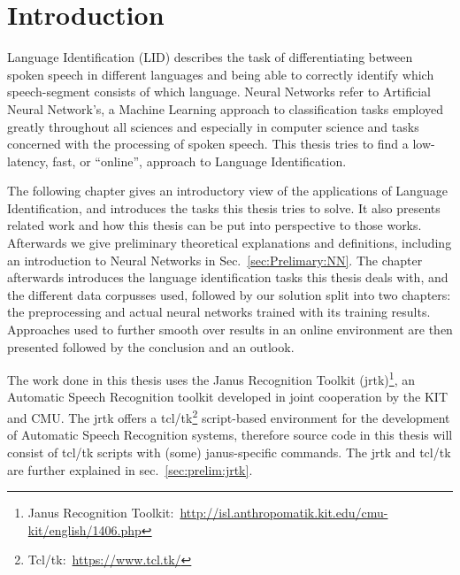 
\chapter{Introduction}
\label{ch:Introduction}
Language Identification (LID) describes the task of differentiating between spoken speech in different languages and being able to correctly identify which speech-segment consists of which language.  Neural Networks refer to Artificial Neural Network's, a Machine Learning approach to classification tasks employed greatly throughout all sciences and especially in computer science and tasks concerned with the processing of spoken speech. This thesis tries to find a low-latency, fast, or ``online'', approach to Language Identification. 

The following chapter gives an introductory view of the applications of Language Identification, and introduces the tasks this thesis tries to solve. It also presents related work and how this thesis can be put into perspective to those works. Afterwards we give preliminary theoretical explanations and definitions, including an introduction to Neural Networks in Sec.~\ref{sec:Prelimary:NN}. The chapter afterwards introduces the language identification tasks this thesis deals with, and the different data corpusses used, followed by our solution split into two chapters: the preprocessing and actual neural networks trained with its training results. Approaches used to further smooth over results in an online environment are then presented followed by the conclusion and an outlook.

The work done in this thesis uses the Janus Recognition Toolkit (jrtk)\footnote{Janus Recognition Toolkit:~\url{http://isl.anthropomatik.kit.edu/cmu-kit/english/1406.php}}, an Automatic Speech Recognition toolkit developed in joint cooperation by the KIT and CMU. The jrtk offers a tcl/tk\footnote{Tcl/tk:~\url{https://www.tcl.tk/}} script-based environment for the development of Automatic Speech Recognition systems, therefore source code in this thesis will consist of tcl/tk scripts with (some) janus-specific commands. The jrtk and tcl/tk are further explained in sec.~\ref{sec:prelim:jrtk}.

